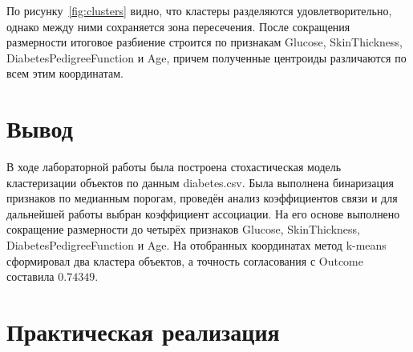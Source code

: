 \documentclass[a4paper, 14pt]{extarticle}
\begin{document}
По рисунку~\ref{fig:clusters} видно, что кластеры разделяются удовлетворительно, однако между ними сохраняется зона пересечения. После сокращения размерности итоговое разбиение строится по признакам Glucose, SkinThickness, DiabetesPedigreeFunction и Age, причем полученные центроиды различаются по всем этим координатам.

\section{Вывод}

В ходе лабораторной работы была построена стохастическая модель кластеризации объектов по данным diabetes.csv. Была выполнена бинаризация признаков по медианным порогам, проведён анализ коэффициентов связи и для дальнейшей работы выбран коэффициент ассоциации. На его основе выполнено сокращение размерности до четырёх признаков Glucose, SkinThickness, DiabetesPedigreeFunction и Age. На отобранных координатах метод k-means сформировал два кластера объектов, а точность согласования с Outcome составила $0.74349$.

\section{Практическая реализация}
\end{document}

